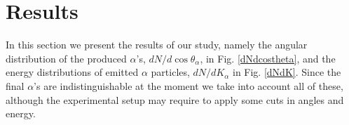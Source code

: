 \documentclass[aps,prc,twocolumn,floatfix,showpacs,a4paper,
nofootinbib,amsmath,amssymb]{revtex4}
\begin{document}
\section{Results}



In this section we present the results of our study, namely the angular distribution of the produced $\alpha$'s, $dN/d\cos\theta_\alpha$,  in Fig. \ref{dNdcostheta},  and the energy distributions of emitted $\alpha$ particles, $dN/dK_{\alpha}$ in Fig. \ref{dNdK}. Since the final $\alpha$'s are indistinguishable at the moment we take into account all of these, although the experimental setup may require to apply some cuts in angles and energy.  







\end{document}

